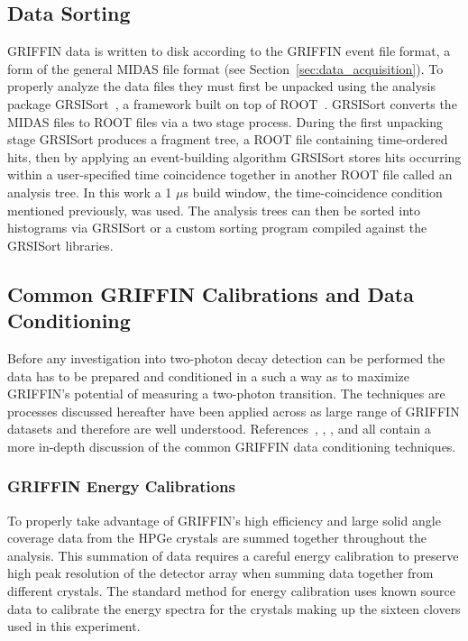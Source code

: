 \documentclass[cnatzke_thesis_proposal.tex]{subfiles}
\begin{document}
\subsection{Data Sorting}
GRIFFIN data is written to disk according to the GRIFFIN event file format, a form of the general MIDAS file format (see Section~\ref{sec:data_acquisition}).
To properly analyze the data files they must first be unpacked using the analysis package GRSISort~\cite{bildstein_griffincollaborationgrsisort_2019}, a framework built on top of ROOT~\cite{brun_root-projectroot_2019}.
GRSISort converts the MIDAS files to ROOT files via a two stage process.
During the first unpacking stage GRSISort produces a fragment tree, a ROOT file containing time-ordered hits, then by applying an event-building algorithm GRSISort stores hits occurring within a user-specified time coincidence together in another ROOT file called an analysis tree.
In this work a 1 $\mu$s build window, the time-coincidence condition mentioned previously, was used.
The analysis trees can then be sorted into histograms via GRSISort or a custom sorting program compiled against the GRSISort libraries.

\subsection{Common GRIFFIN Calibrations and Data Conditioning}
Before any investigation into two-photon decay detection can be performed the data has to be prepared and conditioned in a such a way as to maximize GRIFFIN's potential of measuring a two-photon transition. 
The techniques are processes discussed hereafter have been applied across as large range of GRIFFIN datasets and therefore are well understood. 
References~\cite{smith_gamma-gamma_2019}, \cite{garcia_absence_2020}, \cite{maclean_spectroscopy_2021}, and \cite{porzio_configuration_2021} all contain a more in-depth discussion of the common GRIFFIN data conditioning techniques.

\subsubsection{GRIFFIN Energy Calibrations}
To properly take advantage of GRIFFIN's high efficiency and large solid angle coverage data from the HPGe crystals are summed together throughout the analysis.
This summation of data requires a careful energy calibration to preserve high peak resolution of the detector array when summing data together from different crystals. 
The standard method for energy calibration uses known source data to calibrate the energy spectra for the crystals making up the sixteen clovers used in this experiment. 
\end{document}
